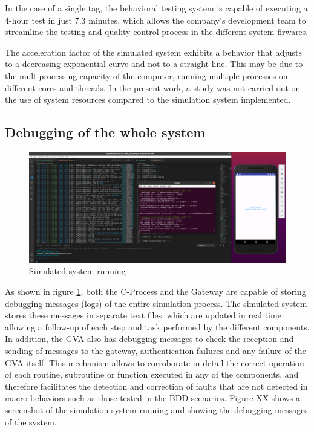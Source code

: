 \documentclass[journal]{IEEEtran}	%
\begin{document}
In the case of a single tag, the behavioral testing system is capable of executing a 4-hour test in just 7.3 minutes, which allows the company's development team to streamline the testing and quality control process in the different system firwares.

The acceleration factor of the simulated system exhibits a behavior that adjusts to a decreasing exponential curve and not to a straight line. This may be due to the multiprocessing capacity of the computer, running multiple processes on different cores and threads. In the present work, a study was not carried out on the use of system resources compared to the simulation system implemented.

\subsection{Debugging of the whole system}

\begin{figure}[H]
\centering
\includegraphics[width=0.99\columnwidth]{simulated.png}
\caption{Simulated system running}
\label{fig:simulated-system}
\end{figure}

As shown in figure \ref{fig:simulated-system}, both the C-Process and the Gateway are capable of storing debugging messages (logs) of the entire simulation process. The simulated system stores these messages in separate text files, which are updated in real time allowing a follow-up of each step and task performed by the different components. In addition, the GVA also has debugging messages to check the reception and sending of messages to the gateway, authentication failures and any failure of the GVA itself. This mechanism allows to corroborate in detail the correct operation of each routine, subroutine or function executed in any of the components, and therefore facilitates the detection and correction of faults that are not detected in macro behaviors such as those tested in the BDD scenarios. Figure XX shows a screenshot of the simulation system running and showing the debugging messages of the system. 
\end{document}
